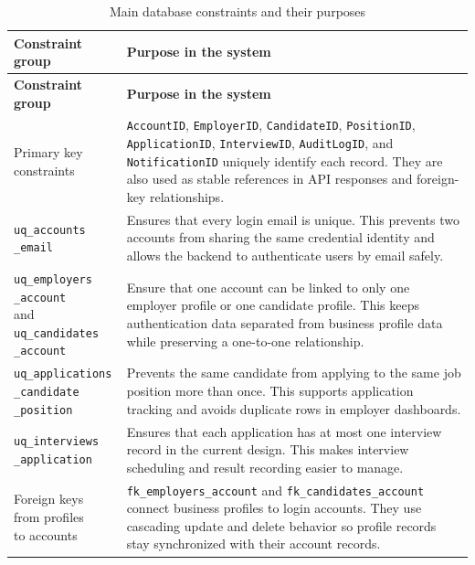 \documentclass[11pt,a4paper]{report}
\makeatletter
\newcommand{\codebreak}[1]{\begin{tabular}[t]{@{}l@{}}#1\end{tabular}}
\makeatother
\begin{document}
\begin{longtable}{L{0.27\textwidth}L{0.63\textwidth}}
\caption{Main database constraints and their purposes}
\label{tab:constraints}\\
\toprule
\textbf{Constraint group} & \textbf{Purpose in the system} \\
\midrule
\endfirsthead
\toprule
\textbf{Constraint group} & \textbf{Purpose in the system} \\
\midrule
\endhead
\codebreak{Primary key\\constraints} & \texttt{AccountID}, \texttt{EmployerID}, \texttt{CandidateID}, \texttt{PositionID}, \texttt{ApplicationID}, \texttt{InterviewID}, \texttt{AuditLogID}, and \texttt{NotificationID} uniquely identify each record. They are also used as stable references in API responses and foreign-key relationships. \\
\codebreak{\texttt{uq\_accounts}\\\texttt{\_email}} & Ensures that every login email is unique. This prevents two accounts from sharing the same credential identity and allows the backend to authenticate users by email safely. \\
\codebreak{\texttt{uq\_employers}\\\texttt{\_account}\\and\\\texttt{uq\_candidates}\\\texttt{\_account}} & Ensure that one account can be linked to only one employer profile or one candidate profile. This keeps authentication data separated from business profile data while preserving a one-to-one relationship. \\
\codebreak{\texttt{uq\_applications}\\\texttt{\_candidate}\\\texttt{\_position}} & Prevents the same candidate from applying to the same job position more than once. This supports application tracking and avoids duplicate rows in employer dashboards. \\
\codebreak{\texttt{uq\_interviews}\\\texttt{\_application}} & Ensures that each application has at most one interview record in the current design. This makes interview scheduling and result recording easier to manage. \\
\codebreak{Foreign keys\\from profiles\\to accounts} & \texttt{fk\_employers\_account} and \texttt{fk\_candidates\_account} connect business profiles to login accounts. They use cascading update and delete behavior so profile records stay synchronized with their account records. \\

\end{longtable}
\end{document}
